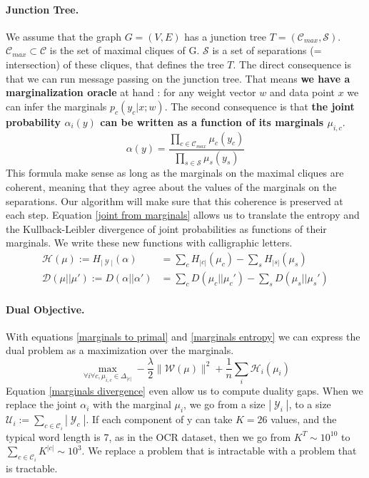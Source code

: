 \documentclass{article}
\DeclareMathOperator{\1}{\mathbb{1}}
\DeclareMathOperator{\Y}{\mathcal{Y}}
\begin{document}
\paragraph{Junction Tree.}
We assume that the graph $G=(V,E)$ has a junction tree $T=(\mathcal C_{max},\mathcal{S})$.
$\mathcal C_{max} \subset \mathcal C $ is the set of maximal cliques of G.
$\mathcal S$ is a set of separations (= intersection) of these cliques, that defines the tree $T$.
The direct consequence is that we can run message passing on the junction tree.
That means \textbf{we have a marginalization oracle} at hand : for any weight vector $w$ and data point $x$ we can infer the marginals $p_c(y_c |x ; w)$.
The second consequence is that \textbf{the joint probability $\alpha_i(y)$ can be written as a function of its marginals $\mu_{i, c}$}.
\begin{equation}
	\label{joint from marginals}
	\alpha(y) = \frac{\prod_{c\in\mathcal{C}_{max}} \mu_c(y_c)}{\prod_{s\in\mathcal{S}} \mu_s(y_s)}
\end{equation}
This formula make sense as long as the marginals on the maximal cliques are coherent, meaning that they agree about the values of the marginals on the separations.
Our algorithm will make sure that this coherence is preserved at each step.
Equation \ref{joint from marginals} allows us to translate the entropy and the Kullback-Leibler divergence of joint probabilities as functions of their marginals. We write these new functions with calligraphic letters.
\begin{align}
	\label{marginals entropy}
	\mathcal H (\mu) := H_{|\Y|} (\alpha) & = \sum_c H_{|c|}(\mu_c) - \sum_s H_{|s|}(\mu_s) \\
	\label{marginals divergence}
	\mathcal D (\mu||\mu') := D(\alpha||\alpha') & = \sum_c D(\mu_c||\mu_c') - \sum_s D(\mu_s||\mu_s')
\end{align}


\paragraph{Dual Objective.}
With equations \ref{marginals to primal} and \ref{marginals entropy} we can express the dual problem as a maximization over the marginals.
\begin{equation}
	\max_{\forall i \forall c, \mu_{i, c} \in \Delta_{|c|} } - \frac{\lambda}{2} \| \mathcal W(\mu)\|^2 + \frac{1}{n} \sum_i \mathcal H _ i(\mu_i)
\end{equation}
Equation \ref{marginals divergence} even allow us to compute duality gaps.
When we replace the joint $\alpha_i$ with the marginal $\mu_i$, we go from a size $|\Y_i|$, to a size $\mathcal U_i := \sum_{c \in \mathcal C_i} |\Y_c|$.
If each component of y can take $K=26$ values, and the typical word length is 7, as in the OCR dataset, then we go from $K^T \sim 10^{10}$ to $\sum_{c \in \mathcal C_i} K^{|c|} \sim 10^3$.
We replace a problem that is intractable with a problem that is tractable.
\end{document}
